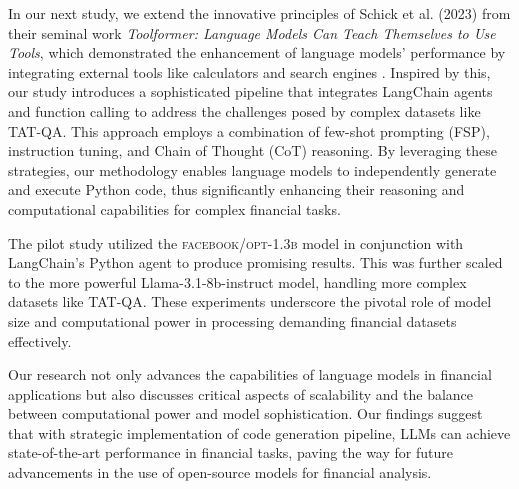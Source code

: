 \documentclass[logo,msc]{infthesis}           %
\begin{document}
In our next study, we extend the innovative principles of Schick et al. (2023) from their seminal work \textit{Toolformer: Language Models Can Teach Themselves to Use Tools}, which demonstrated the enhancement of language models' performance by integrating external tools like calculators and search engines \cite{schick2023toolformer}. Inspired by this, our study introduces a sophisticated pipeline that integrates LangChain agents and function calling to address the challenges posed by complex datasets like TAT-QA. This approach employs a combination of few-shot prompting (FSP), instruction tuning, and Chain of Thought (CoT) reasoning. By leveraging these strategies, our methodology enables language models to independently generate and execute Python code, thus significantly enhancing their reasoning and computational capabilities for complex financial tasks.

The pilot study utilized the \textsc{facebook/opt-1.3b} model in conjunction with LangChain's Python agent to produce promising results. This was further scaled to the more powerful Llama-3.1-8b-instruct model, handling more complex datasets like TAT-QA. These experiments underscore the pivotal role of model size and computational power in processing demanding financial datasets effectively.

Our research not only advances the capabilities of language models in financial applications but also discusses critical aspects of scalability and the balance between computational power and model sophistication. Our findings suggest that with strategic implementation of code generation pipeline, LLMs can achieve state-of-the-art performance in financial tasks, paving the way for future advancements in the use of open-source models for financial analysis. 

\end{document}
